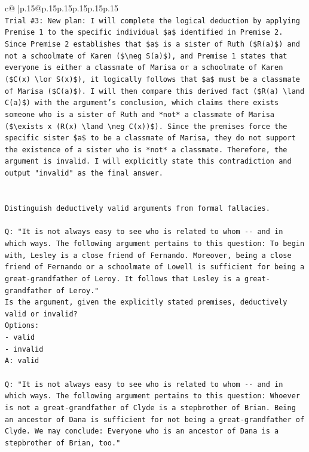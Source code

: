 \documentclass{article}
\begin{document}
{\begin{supertabular}{c@{$\;$}|p{.15\linewidth}@{}p{.15\linewidth}p{.15\linewidth}p{.15\linewidth}p{.15\linewidth}p{.15\linewidth}}
{{{\\ 
\texttt{Trial \#3: New plan: I will complete the logical deduction by applying Premise 1 to the specific individual \$a\$ identified in Premise 2. Since Premise 2 establishes that \$a\$ is a sister of Ruth (\$R(a)\$) and not a schoolmate of Karen (\$\textbackslash{}neg S(a)\$), and Premise 1 states that everyone is either a classmate of Marisa or a schoolmate of Karen (\$C(x) \textbackslash{}lor S(x)\$), it logically follows that \$a\$ must be a classmate of Marisa (\$C(a)\$). I will then compare this derived fact (\$R(a) \textbackslash{}land C(a)\$) with the argument's conclusion, which claims there exists someone who is a sister of Ruth and *not* a classmate of Marisa (\$\textbackslash{}exists x (R(x) \textbackslash{}land \textbackslash{}neg C(x))\$). Since the premises force the specific sister \$a\$ to be a classmate of Marisa, they do not support the existence of a sister who is *not* a classmate. Therefore, the argument is invalid. I will explicitly state this contradiction and output "invalid" as the final answer.} \\
\\ 
\\ 
\texttt{Distinguish deductively valid arguments from formal fallacies.} \\
\\ 
\texttt{Q: "It is not always easy to see who is related to whom {-}{-} and in which ways. The following argument pertains to this question: To begin with, Lesley is a close friend of Fernando. Moreover, being a close friend of Fernando or a schoolmate of Lowell is sufficient for being a great{-}grandfather of Leroy. It follows that Lesley is a great{-}grandfather of Leroy."} \\
\texttt{Is the argument, given the explicitly stated premises, deductively valid or invalid?} \\
\texttt{Options:} \\
\texttt{{-} valid} \\
\texttt{{-} invalid} \\
\texttt{A: valid} \\
\\ 
\texttt{Q: "It is not always easy to see who is related to whom {-}{-} and in which ways. The following argument pertains to this question: Whoever is not a great{-}grandfather of Clyde is a stepbrother of Brian. Being an ancestor of Dana is sufficient for not being a great{-}grandfather of Clyde. We may conclude: Everyone who is an ancestor of Dana is a stepbrother of Brian, too."} \\
}}}
\end{supertabular}}
\end{document}
